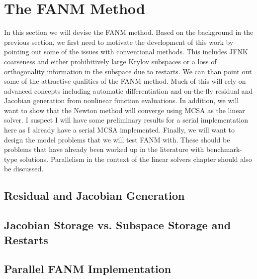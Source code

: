 \section{The FANM Method}
\label{sec:fanm}
In this section we will devise the FANM method. Based on the
background in the previous section, we first need to motivate the
development of this work by pointing out some of the issues with
conventional methods. This includes JFNK coarseness and either
prohibitively large Krylov subspaces or a loss of orthogonality
information in the subspace due to restarts. We can than point out
some of the attractive qualities of the FANM method. Much of this will
rely on advanced concepts including automatic differentiation and
on-the-fly residual and Jacobian generation from nonlinear function
evaluations. In addition, we will want to show that the Newton method
will converge using MCSA as the linear solver. I suspect I will have
some preliminary results for a serial implementation here as I already
have a serial MCSA implemented. Finally, we will want to design the
model problems that we will test FANM with. These should be problems
that have already been worked up in the literature with benchmark-type
solutions. Parallelism in the context of the linear solvers chapter
should also be discussed.

\subsection{Residual and Jacobian Generation}
\label{subsec:fanm_generation}

\subsection{Jacobian Storage vs. Subspace Storage and Restarts}
\label{subsec:fanm_storage}

\subsection{Parallel FANM Implementation}
\label{subsec:parallel_fanm}
